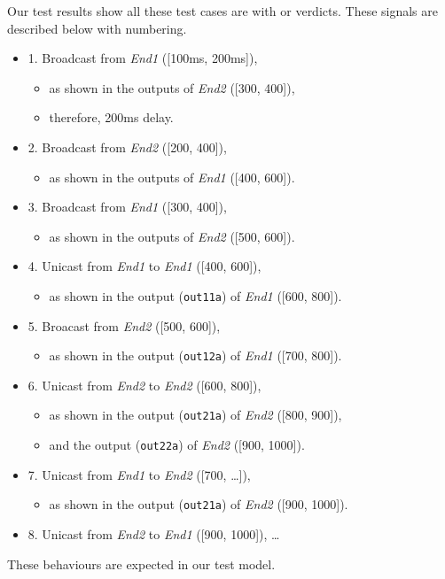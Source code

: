  Our test results show all these test cases are with  or  verdicts. These signals are described below with numbering.
\begin{itemize}
    \item 1. Broadcast from \emph{End1} ([100ms, 200ms]), 
        \begin{itemize}
            \item as shown in the outputs of \emph{End2} ([300, 400]),
            \item therefore, 200ms delay.
        \end{itemize}
    \item 2. Broadcast from \emph{End2} ([200, 400]), 
        \begin{itemize}
            \item as shown in the outputs of \emph{End1} ([400, 600]).
        \end{itemize}
    \item 3. Broadcast from \emph{End1} ([300, 400]), 
        \begin{itemize}
            \item as shown in the outputs of \emph{End2} ([500, 600]).
        \end{itemize}
    \item 4. Unicast from \emph{End1} to \emph{End1} ([400, 600]), 
        \begin{itemize}
            \item as shown in the output (\verb+out11a+) of \emph{End1} ([600, 800]).
        \end{itemize}
    \item 5. Broacast from \emph{End2} ([500, 600]), 
        \begin{itemize}
            \item as shown in the output (\verb+out12a+) of \emph{End1} ([700, 800]).
        \end{itemize}
    \item 6. Unicast from \emph{End2} to \emph{End2} ([600, 800]), 
        \begin{itemize}
            \item as shown in the output (\verb+out21a+) of \emph{End2} ([800, 900]),
            \item and the output (\verb+out22a+) of \emph{End2} ([900, 1000]).
        \end{itemize}
    \item 7. Unicast from \emph{End1} to \emph{End2} ([700, \ldots]), 
        \begin{itemize}
            \item as shown in the output (\verb+out21a+) of \emph{End2} ([900, 1000]).
        \end{itemize}
    \item 8. Unicast from \emph{End2} to \emph{End1} ([900, 1000]), \ldots
\end{itemize}

These behaviours are expected in our test model.
